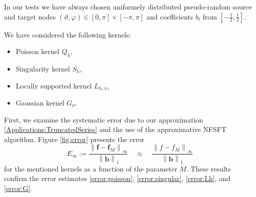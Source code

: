 \documentclass[11pt,a4paper,twoside,bibtotoc]{scrartcl}
\theoremstyle{plain}
\theoremstyle{definition}
\theoremstyle{remark}
\newcommand{\paren}[1]{\ensuremath{\left(#1\right)}}
\newcommand{\mb}[1]{\mathbf{#1}}
\newcommand{\V}[1]{\mb{#1}}
\numberwithin{equation}{section}
\numberwithin{table}{section}
\numberwithin{figure}{section}
\begin{document}
In our tests we have always chosen uniformely distributed pseudo-random 
source and target nodes 
$\paren{\vartheta,\varphi} \in [0,\pi] \times [-\pi,\pi]$ and 
coefficients $b_l$ from $\left[-\frac{1}{2},\frac{1}{2}\right]$.

We have considered the following kernels:

\begin{itemize}
  \item Poisson kernel $Q_{h}$,
  \item Singularity kernel $S_{h}$,
  \item Locally supported kernel $L_{h,\lambda}$,
  \item Gaussian kernel $G_{\sigma}$.
\end{itemize}


First, we examine the systematic error due to our approximation
\eqref{Applications:TruncatedSeries} and the use of the  approximative NFSFT
algorithm. Figure \ref{fig:error} presents the error
\[
E_{\infty}:=
\frac{\left\|\V{f}-\V{f}_M\right\|_{\infty}}{\left\|\V{b}\right\|_{1}}
\quad \approx \quad \frac{\left\|f-f_M\right\|_{\infty}}{\left\|\V{b}\right\|_{1}}
\]
for the mentioned kernels as a function of the parameter $M$.
These results confirm the error estimates \eqref{error:poisson},
\eqref{error:singular}, \eqref{error:Lh}, and \eqref{error:G}.
\end{document}

